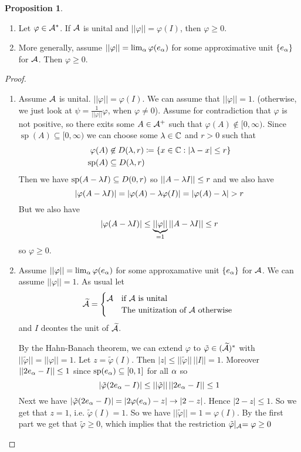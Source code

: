 \documentclass[10pt,english,a4paper]{article}
\theoremstyle{definition}
\newtheorem*{proposition}{Proposition}
\def\tAs{\widetilde{\As}}
\def\tvphi{\tilde{\varphi}}
\DeclareMathOperator{\Sp}{sp}
\def\vphi{\varphi}
\begin{document}
\begin{proposition}\leavevmode
\begin{enumerate}[(1)]
    \item 
    Let $\varphi \in \mathcal{A}^*$. If $\mathcal{A}$ is unital and $||\varphi|| = \varphi(I)$, 
then $\varphi \geq 0$.
\item More generally, assume $||\varphi|| = \lim_{\alpha}\varphi(e_{\alpha})$ for some
approximative unit $\{e_{\alpha}\}$ for $\mathcal{A}$. Then $\varphi \geq 0$.

\end{enumerate}

\end{proposition}
\begin{proof}
\begin{enumerate}[(1)]
    \item 
    Assume $\mathcal{A}$ is unital. $||\varphi|| = \varphi(I)$. We can assume that
$||\varphi||= 1$. (otherwise, we just look at $\psi =
\frac{1}{||\varphi||}\varphi$, when $\varphi\neq 0$). Assume for contradiction
that $\varphi$ is not positive, so there exits some $A\in \mathcal{A}^+$ such that
$\varphi(A)\not\in [0,\infty)$. 
Since $\Sp(A) \subseteq [0,\infty)$ we can choose some $\lambda \in \mathbb{C}$
and $r> 0$ such that 
\begin{align*}
\varphi(A) &\not\in D(\la, r)\coloneqq \{ x \in \C: |\la -x|\leq r \} \\ 
\Sp(A) &\subseteq D(\la,r)
\end{align*}
Then we have $\Sp(A -\la I) \subseteq D(0,r)$ so $||A-\lambda I||\leq r$ and 
we also have 
\[ |\varphi(A-\lambda I)|  = |\varphi(A) - \lambda \varphi(I)| = 
|\varphi(A) - \lambda| > r\]
But we also have
\[ |\varphi(A-\lambda I)| \leq \underbrace{||\varphi||}_{=1} ||A-\lambda I ||\leq r \]
so $\varphi \geq 0$.

\item 
Assume $||\varphi|| = \lim_{\alpha}\varphi(e_{\alpha})$ for some approxamative 
unit $\{e_{\alpha}\}$ for $\mathcal{A}$. We can assume $||\varphi||=1$.
As usual let 
\[ \tAs = \begin{cases} \As &\text{if $\As$ is unital}\\ &\text{The unitization of $\As$ otherwise } \end{cases}\]
and $I$ deontes the unit of $\tAs$.

By the Hahn-Banach theorem, we can extend $\varphi$ to $\tilde{\varphi} \in 
(\tAs)^*$ with $||\tilde{\varphi}|| = ||\varphi|| = 1$. 
Let $z = \tvphi(I)$. Then $|z| \leq ||\tvphi||\, ||I||  = 1$. Moreover 
$||2e_{\alpha} - I||\leq 1$ since $\Sp(e_{\al}) \subseteq [0,1]$ for all $\alpha$
so 
\[ |\tvphi(2e_{\al} - I)| \leq ||\tvphi|| \, ||2e_{\al} - I||\leq 1 \]  
Next we have $|\tvphi(2e_{\al} - I)| = |2\vphi(e_{\al}) - z| \to |2-z|$. 
Hence  $|2-z|\leq 1$.
So we get that $z = 1$, i.e. $\tvphi(I) = 1$.
So we have $||\tvphi|| = 1 = \vphi(I)$. By the first part we get that 
$\tvphi \geq 0$, which implies that the restriction $\tvphi\lvert_{\As} = \vphi \geq 0$
\end{enumerate}
\end{proof}
\end{document}

